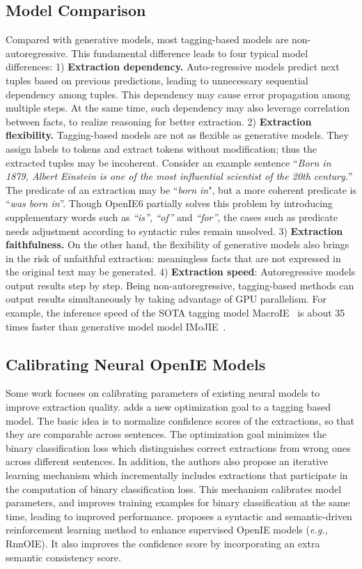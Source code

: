 \documentclass{article}
\newcommand{\eg}{\emph{e.g.,}\xspace}
\begin{document}
\subsection{Model Comparison}
\label{sec:methods-compare}
Compared with generative models, most tagging-based models are non-autoregressive.
This fundamental difference leads to four typical model differences: 1) \textbf{Extraction dependency.} Auto-regressive models predict next tuples based on previous predictions, leading to unnecessary sequential dependency among tuples. This dependency may cause error propagation among multiple steps. At the same time, such dependency may also leverage correlation between facts, to realize reasoning for better extraction.
2) \textbf{Extraction flexibility.} Tagging-based models are not as flexible as  generative models. They assign labels to tokens and extract tokens without modification; thus the extracted tuples may be incoherent. Consider an example sentence ``\textit{Born in 1879, Albert Einstein is one of the most influential scientist of the 20th century.}'' The predicate of an extraction may be ``\textit{born in}", but a more coherent predicate is ``\textit{was born in}''. Though OpenIE6 partially solves this problem by introducing supplementary words such as \textit{``is''}, \textit{``of''} and \textit{``for''}, the cases such as predicate needs adjustment according to syntactic rules remain unsolved.
3) \textbf{Extraction faithfulness.} On the other hand, the flexibility of generative models also brings in the risk of unfaithful extraction: meaningless facts that are not expressed in the original text may be generated.
4) \textbf{Extraction speed}: Autoregressive models output results step by step. Being non-autoregressive, tagging-based methods can output results simultaneously by taking advantage of GPU parallelism. For example, the inference speed of the SOTA tagging model MacroIE~\cite{yu2021maximal} is about 35 times faster than generative model model IMoJIE~\cite{kolluru-etal-2020-imojie}.

\subsection{Calibrating Neural OpenIE Models}
Some work focuses on calibrating parameters of existing neural  models to improve extraction quality. \cite{jiang-etal-2019-improving} adds a new optimization goal to a tagging based model. The basic idea is to normalize confidence scores of the extractions, so that they are comparable across sentences. The optimization goal minimizes the binary classification loss which distinguishes correct extractions from wrong ones across different sentences. In addition, the authors also propose an iterative learning mechanism which incrementally includes extractions that participate in the computation of binary classification loss. This mechanism calibrates model parameters, and improves training examples for binary classification at the same time, leading to improved performance. \cite{tang-etal-2020-syntactic} proposes a syntactic and semantic-driven reinforcement learning method to enhance supervised OpenIE models (\eg RnnOIE). It also improves the confidence score by incorporating an extra semantic consistency score.
\end{document}
